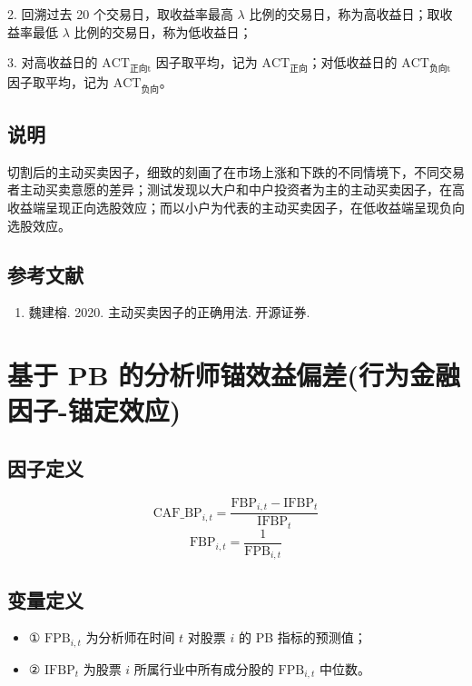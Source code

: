 \documentclass{article}
\begin{document}
2. 回溯过去 20 个交易日，取收益率最高 \( \lambda \) 比例的交易日，称为高收益日；取收益率最低 \( \lambda \) 比例的交易日，称为低收益日；

3. 对高收益日的 \( \mathrm{ACT}_{\text{正向t}} \) 因子取平均，记为 \( \mathrm{ACT}_{\text{正向}} \)；对低收益日的 \( \mathrm{ACT}_{\text{负向t}} \) 因子取平均，记为 \( \mathrm{ACT}_{\text{负向}} \)。

\subsection{说明}
切割后的主动买卖因子，细致的刻画了在市场上涨和下跌的不同情境下，不同交易者主动买卖意愿的差异；测试发现以大户和中户投资者为主的主动买卖因子，在高收益端呈现正向选股效应；而以小户为代表的主动买卖因子，在低收益端呈现负向选股效应。

\subsection{参考文献}
\begin{enumerate}
    \item 魏建榕. 2020. 主动买卖因子的正确用法. 开源证券.
\end{enumerate}

\section{基于 PB 的分析师锚效益偏差(行为金融因子-锚定效应)}

\subsection{因子定义}

\begin{equation}
    \mathrm{CAF\_BP}_{i,t} = \frac{\mathrm{FBP}_{i,t} - \mathrm{IFBP}_t}{\mathrm{IFBP}_t}
\end{equation}
\begin{equation}
    \mathrm{FBP}_{i,t} = \frac{1}{\mathrm{FPB}_{i,t}}
\end{equation}

\subsection{变量定义}
\begin{itemize}
    \item ① \( \mathrm{FPB}_{i,t} \) 为分析师在时间 \( t \) 对股票 \( i \) 的 PB 指标的预测值；
    \item ② \( \mathrm{IFBP}_t \) 为股票 \( i \) 所属行业中所有成分股的 \( \mathrm{FPB}_{i,t} \) 中位数。
\end{itemize}
\end{document}
